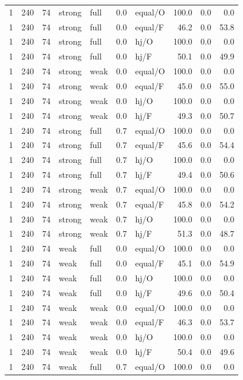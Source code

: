 {\begin{longtable}{@{}rrrllllrrr@{}}
1 & 240 & 74 & strong & full & 0.0 & equal/O & 100.0 & 0.0 & 0.0\\
1 & 240 & 74 & strong & full & 0.0 & equal/F & 46.2 & 0.0 & 53.8\\
1 & 240 & 74 & strong & full & 0.0 & hj/O & 100.0 & 0.0 & 0.0\\
1 & 240 & 74 & strong & full & 0.0 & hj/F & 50.1 & 0.0 & 49.9\\
1 & 240 & 74 & strong & weak & 0.0 & equal/O & 100.0 & 0.0 & 0.0\\
1 & 240 & 74 & strong & weak & 0.0 & equal/F & 45.0 & 0.0 & 55.0\\
1 & 240 & 74 & strong & weak & 0.0 & hj/O & 100.0 & 0.0 & 0.0\\
1 & 240 & 74 & strong & weak & 0.0 & hj/F & 49.3 & 0.0 & 50.7\\
1 & 240 & 74 & strong & full & 0.7 & equal/O & 100.0 & 0.0 & 0.0\\
1 & 240 & 74 & strong & full & 0.7 & equal/F & 45.6 & 0.0 & 54.4\\
1 & 240 & 74 & strong & full & 0.7 & hj/O & 100.0 & 0.0 & 0.0\\
1 & 240 & 74 & strong & full & 0.7 & hj/F & 49.4 & 0.0 & 50.6\\
1 & 240 & 74 & strong & weak & 0.7 & equal/O & 100.0 & 0.0 & 0.0\\
1 & 240 & 74 & strong & weak & 0.7 & equal/F & 45.8 & 0.0 & 54.2\\
1 & 240 & 74 & strong & weak & 0.7 & hj/O & 100.0 & 0.0 & 0.0\\
1 & 240 & 74 & strong & weak & 0.7 & hj/F & 51.3 & 0.0 & 48.7\\
1 & 240 & 74 & weak & full & 0.0 & equal/O & 100.0 & 0.0 & 0.0\\
1 & 240 & 74 & weak & full & 0.0 & equal/F & 45.1 & 0.0 & 54.9\\
1 & 240 & 74 & weak & full & 0.0 & hj/O & 100.0 & 0.0 & 0.0\\
1 & 240 & 74 & weak & full & 0.0 & hj/F & 49.6 & 0.0 & 50.4\\
1 & 240 & 74 & weak & weak & 0.0 & equal/O & 100.0 & 0.0 & 0.0\\
1 & 240 & 74 & weak & weak & 0.0 & equal/F & 46.3 & 0.0 & 53.7\\
1 & 240 & 74 & weak & weak & 0.0 & hj/O & 100.0 & 0.0 & 0.0\\
1 & 240 & 74 & weak & weak & 0.0 & hj/F & 50.4 & 0.0 & 49.6\\
1 & 240 & 74 & weak & full & 0.7 & equal/O & 100.0 & 0.0 & 0.0\\

\end{longtable}}
